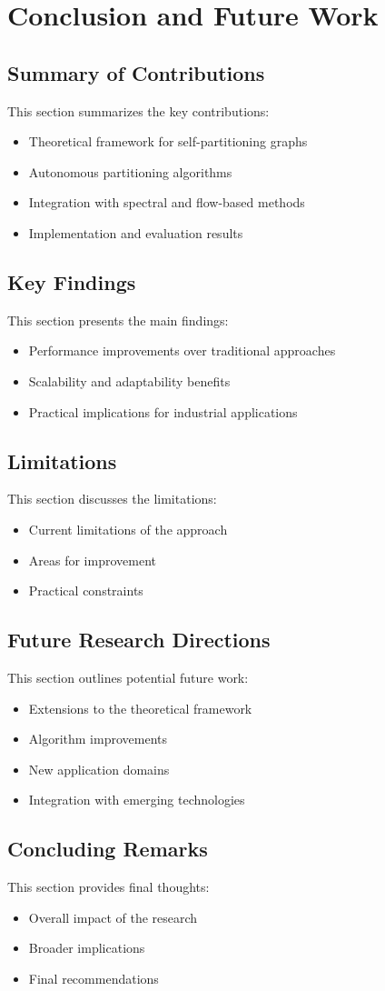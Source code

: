 \chapter{Conclusion and Future Work}

\section{Summary of Contributions}
This section summarizes the key contributions:
\begin{itemize}
    \item Theoretical framework for self-partitioning graphs
    \item Autonomous partitioning algorithms
    \item Integration with spectral and flow-based methods
    \item Implementation and evaluation results
\end{itemize}

\section{Key Findings}
This section presents the main findings:
\begin{itemize}
    \item Performance improvements over traditional approaches
    \item Scalability and adaptability benefits
    \item Practical implications for industrial applications
\end{itemize}

\section{Limitations}
This section discusses the limitations:
\begin{itemize}
    \item Current limitations of the approach
    \item Areas for improvement
    \item Practical constraints
\end{itemize}

\section{Future Research Directions}
This section outlines potential future work:
\begin{itemize}
    \item Extensions to the theoretical framework
    \item Algorithm improvements
    \item New application domains
    \item Integration with emerging technologies
\end{itemize}

\section{Concluding Remarks}
This section provides final thoughts:
\begin{itemize}
    \item Overall impact of the research
    \item Broader implications
    \item Final recommendations
\end{itemize} 